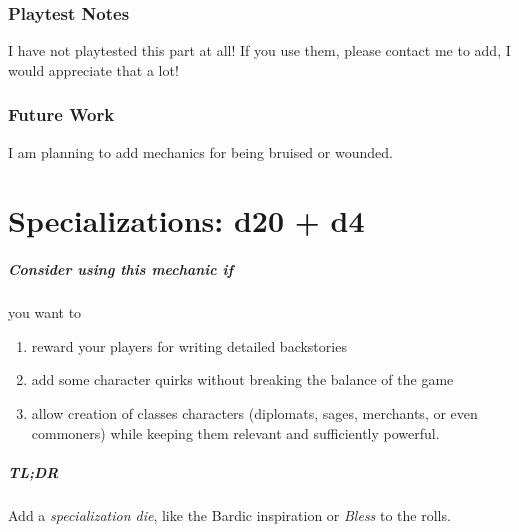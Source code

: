 \documentclass[twocolumn]{dndbook}
\begin{document}
\subsection{Playtest Notes}

I have not playtested this part at all! If you use them, please contact me to add, I would appreciate that a lot!




\subsection{Future Work}
I am planning to add mechanics for being bruised or wounded.





\chapter{Specializations: d20 + d4}
\label{chap:d20_plus_d4}

\begin{emphasisParagraph}
	\paragraph*{Consider using this mechanic if} you want to
	\begin{enumerate}
    \item reward your players for writing detailed backstories
    \item add some character quirks without breaking the balance of the game
    \item allow creation of classes characters (diplomats, sages, merchants, or even commoners) while keeping them relevant and sufficiently powerful.
    \end{enumerate}
\end{emphasisParagraph}

\paragraph*{TL;DR} Add a \emph{specialization die}, like the Bardic inspiration or \emph{Bless} to the rolls.
\end{document}
